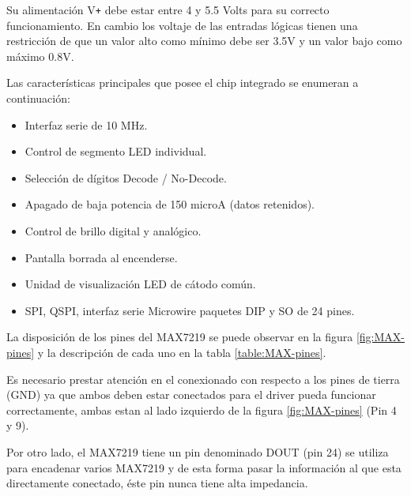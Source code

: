 Su alimentación V\texttt{+} debe estar entre 4 y 5.5 Volts para su correcto funcionamiento. En cambio los voltaje de las entradas lógicas tienen una restricción de que un valor alto como mínimo debe ser 3.5V y un valor bajo como máximo 0.8V.

Las características principales que posee el chip integrado se enumeran a continuación:
\begin{itemize}
	\item Interfaz serie de 10 MHz.
	\item Control de segmento LED individual.
	\item Selección de dígitos Decode / No-Decode.
	\item Apagado de baja potencia de 150 microA (datos retenidos).
	\item Control de brillo digital y analógico.
	\item Pantalla borrada al encenderse.
	\item Unidad de visualización LED de cátodo común.
	\item SPI, QSPI, interfaz serie Microwire paquetes DIP y SO de 24 pines.
\end{itemize}

La disposición de los pines del MAX7219 se puede observar en la figura \ref{fig:MAX-pines} y la descripción de cada uno en la tabla \ref{table:MAX-pines}.

Es necesario prestar atención en el conexionado con respecto a los pines de tierra (GND) ya que ambos deben estar conectados para el driver pueda funcionar correctamente, ambas estan al lado izquierdo de la figura \ref{fig:MAX-pines} (Pin 4 y 9).

Por otro lado, el MAX7219 tiene un pin denominado DOUT (pin 24) se utiliza para encadenar varios MAX7219 y de esta forma pasar la información al que esta directamente conectado, éste pin nunca tiene alta impedancia.\\

